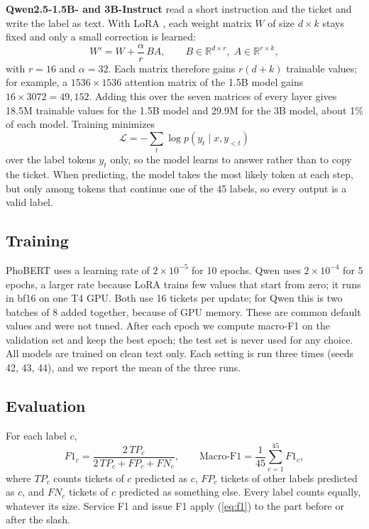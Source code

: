 \documentclass[conference]{IEEEtran}
\begin{document}
\textbf{Qwen2.5-1.5B- and 3B-Instruct} \cite{qwen2024qwen25} read a short
instruction and the ticket and write the label as text. With LoRA
\cite{hu2022lora}, each weight matrix $W$ of size $d\times k$ stays fixed
and only a small correction is learned:
\begin{equation}
W' = W + \frac{\alpha}{r}\,BA,\qquad B\in\mathbb{R}^{d\times r},\;A\in\mathbb{R}^{r\times k},
\label{eq:lora}
\end{equation}
with $r=16$ and $\alpha=32$. Each matrix therefore gains $r(d+k)$ trainable
values; for example, a $1536\times1536$ attention matrix of the 1.5B model
gains $16\times3072=49{,}152$. Adding this over the seven matrices of every
layer gives 18.5M trainable values for the 1.5B model and 29.9M for the 3B
model, about 1\% of each model. Training minimizes
\begin{equation}
\mathcal{L}=-\sum_{t}\log p(y_t\mid x,y_{<t})
\label{eq:loss}
\end{equation}
over the label tokens $y_t$ only, so the model learns to answer rather
than to copy the ticket. When predicting, the model takes the most likely
token at each step, but only among tokens that continue one of the 45
labels, so every output is a valid label.

\subsection{Training}
PhoBERT uses a learning rate of $2\times10^{-5}$ for 10 epochs. Qwen uses
$2\times10^{-4}$ for 5 epochs, a larger rate because LoRA trains few values
that start from zero; it runs in bf16 on one T4 GPU. Both use 16 tickets
per update; for Qwen this is two batches of 8 added together, because of
GPU memory. These are common default values and were not tuned. After each
epoch we compute macro-F1 on the validation set and keep the best epoch;
the test set is never used for any choice. All models are trained on clean
text only. Each setting is run three times (seeds 42, 43, 44), and we
report the mean of the three runs.

\subsection{Evaluation}
For each label $c$,
\begin{equation}
F1_c=\frac{2\,TP_c}{2\,TP_c+FP_c+FN_c},\qquad
\text{Macro-F1}=\frac{1}{45}\sum_{c=1}^{45}F1_c,
\label{eq:f1}
\end{equation}
where $TP_c$ counts tickets of $c$ predicted as $c$, $FP_c$ tickets of other
labels predicted as $c$, and $FN_c$ tickets of $c$ predicted as something
else. Every label counts equally, whatever its size. Service F1 and issue F1
apply (\ref{eq:f1}) to the part before or after the slash.
\end{document}
